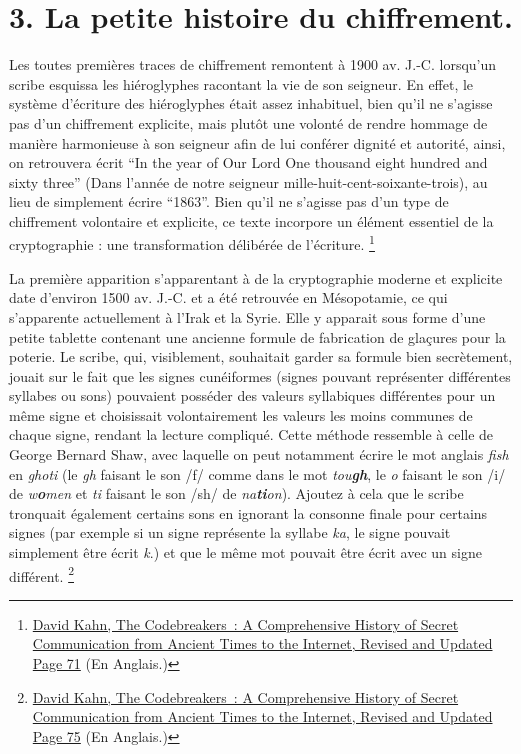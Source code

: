 \documentclass[
  paper=a4,
  ,captions=tableheading
]{scrartcl}
\begin{document}
\section{3. La petite histoire du
chiffrement.}\label{la-petite-histoire-du-chiffrement.}

Les toutes premières traces de chiffrement remontent à 1900 av. J.-C.
lorsqu'un scribe esquissa les hiéroglyphes racontant la vie de son
seigneur. En effet, le système d'écriture des hiéroglyphes était assez
inhabituel, bien qu'il ne s'agisse pas d'un chiffrement explicite, mais
plutôt une volonté de rendre hommage de manière harmonieuse à son
seigneur afin de lui conférer dignité et autorité, ainsi, on retrouvera
écrit ``In the year of Our Lord One thousand eight hundred and sixty
three'' (Dans l'année de notre seigneur mille-huit-cent-soixante-trois),
au lieu de simplement écrire ``1863''. Bien qu'il ne s'agisse pas d'un
type de chiffrement volontaire et explicite, ce texte incorpore un
élément essentiel de la cryptographie : une transformation délibérée de
l'écriture. \footnote{\href{https://archive.org/details/B-001-001-264/page/n47/mode/1up?view=theater}{David
  Kahn, The Codebreakers~: A Comprehensive History of Secret
  Communication from Ancient Times to the Internet, Revised and Updated
  \textbar{} Page 71} (En Anglais.)}

La première apparition s'apparentant à de la cryptographie moderne et
explicite date d'environ 1500 av. J.-C. et a été retrouvée en
Mésopotamie, ce qui s'apparente actuellement à l'Irak et la Syrie. Elle
y apparait sous forme d'une petite tablette contenant une ancienne
formule de fabrication de glaçures pour la poterie. Le scribe, qui,
visiblement, souhaitait garder sa formule bien secrètement, jouait sur
le fait que les signes cunéiformes (signes pouvant représenter
différentes syllabes ou sons) pouvaient posséder des valeurs syllabiques
différentes pour un même signe et choisissait volontairement les valeurs
les moins communes de chaque signe, rendant la lecture compliqué. Cette
méthode ressemble à celle de George Bernard Shaw, avec laquelle on peut
notamment écrire le mot anglais \emph{fish} en \emph{ghoti} (le
\emph{gh} faisant le son /f/ comme dans le mot \emph{tou\textbf{gh}}, le
\emph{o} faisant le son /i/ de \emph{w\textbf{o}men} et \emph{ti}
faisant le son /sh/ de \emph{na\textbf{ti}on}). Ajoutez à cela que le
scribe tronquait également certains sons en ignorant la consonne finale
pour certains signes (par exemple si un signe représente la syllabe
\emph{ka}, le signe pouvait simplement être écrit \emph{k}.) et que le
même mot pouvait être écrit avec un signe différent. \footnote{\href{https://archive.org/details/B-001-001-264/page/n48/mode/1up?view=theater}{David
  Kahn, The Codebreakers~: A Comprehensive History of Secret
  Communication from Ancient Times to the Internet, Revised and Updated
  \textbar{} Page 75} (En Anglais.)}
\end{document}
